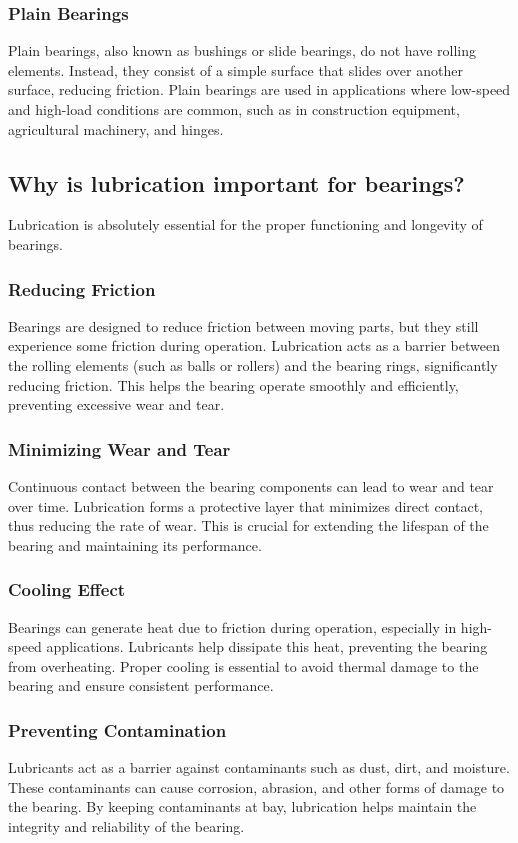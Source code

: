 \documentclass[../../main]{subfiles}
\begin{document}
\subsubsection{Plain Bearings}
Plain bearings, also known as bushings or slide bearings, do not have rolling elements. Instead, they consist of a simple surface that slides over another surface, reducing friction. Plain bearings are used in applications where low-speed and high-load conditions are common, such as in construction equipment, agricultural machinery, and hinges.

\subsection{Why is lubrication important for bearings?}
Lubrication is absolutely essential for the proper functioning and longevity of bearings.

\subsubsection{Reducing Friction}
Bearings are designed to reduce friction between moving parts, but they still experience some friction during operation. Lubrication acts as a barrier between the rolling elements (such as balls or rollers) and the bearing rings, significantly reducing friction. This helps the bearing operate smoothly and efficiently, preventing excessive wear and tear.

\subsubsection{Minimizing Wear and Tear}
Continuous contact between the bearing components can lead to wear and tear over time. Lubrication forms a protective layer that minimizes direct contact, thus reducing the rate of wear. This is crucial for extending the lifespan of the bearing and maintaining its performance.

\subsubsection{Cooling Effect}
Bearings can generate heat due to friction during operation, especially in high-speed applications. Lubricants help dissipate this heat, preventing the bearing from overheating. Proper cooling is essential to avoid thermal damage to the bearing and ensure consistent performance.

\subsubsection{Preventing Contamination}
Lubricants act as a barrier against contaminants such as dust, dirt, and moisture. These contaminants can cause corrosion, abrasion, and other forms of damage to the bearing. By keeping contaminants at bay, lubrication helps maintain the integrity and reliability of the bearing.
\end{document}
